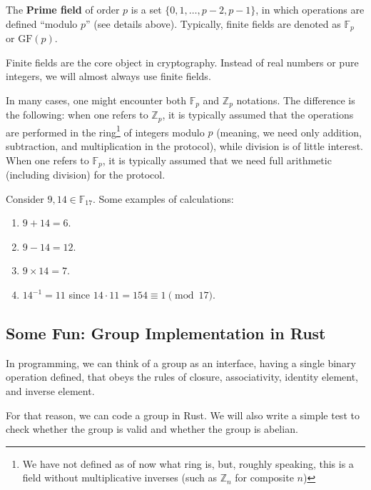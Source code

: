 \documentclass[../../book.tex]{subfiles}
\begin{document}
\begin{definition}
    The \textbf{Prime field} of order $p$ is a set $\{0,1,\dots,p-2,p-1\}$, in
    which operations are defined ``modulo $p$'' (see details above). Typically,
    finite fields are denoted as $\mathbb{F}_p$ or $\text{GF}(p)$.
\end{definition}

Finite fields are the core object in cryptography. Instead of real numbers or pure integers, we will almost always 
use finite fields.

\begin{remark}
    In many cases, one might encounter both $\mathbb{F}_p$ and $\mathbb{Z}_p$ notations. The difference is the 
    following: when one refers to $\mathbb{Z}_p$, it is typically assumed that the operations are performed in 
    the ring\footnote{We have not defined as of now what ring is, but, roughly speaking, this is a field without 
    multiplicative inverses (such as $\mathbb{Z}_n$ for composite $n$)} of integers modulo $p$ (meaning, we need only addition, subtraction, and multiplication 
    in the protocol), while division is of little interest. When one refers to $\mathbb{F}_p$, it is typically 
    assumed that we need full arithmetic (including division) for the protocol.
\end{remark}

\begin{example}
    Consider $9, 14 \in \mathbb{F}_{17}$. Some examples of calculations:
    \begin{enumerate}
        \item $9+14 = 6$.
        \item $9-14 = 12$.
        \item $9 \times 14 = 7$.
        \item $14^{-1} = 11$ since $14 \cdot 11 = 154 \equiv 1 \pmod{17}$.
    \end{enumerate}
\end{example}

\subsection{Some Fun: Group Implementation in Rust}

In programming, we can think of a group as an interface, having a single binary operation defined, that obeys the 
rules of closure, associativity, identity element, and inverse element.

For that reason, we can code a group in Rust. We will also write a simple test to check whether the group is 
valid and whether the group is abelian.
\end{document}
